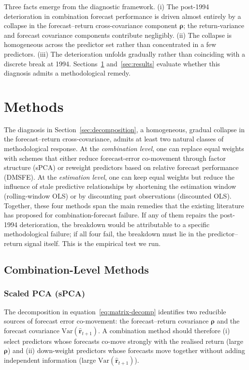 \documentclass[a4paper,11pt]{article}
\begin{document}
Three facts emerge from the diagnostic framework. (i) The post-1994
deterioration in combination forecast performance is driven almost
entirely by a collapse in the forecast--return cross-covariance
component $\boldsymbol{\rho}$; the return-variance and forecast
covariance components contribute negligibly. (ii) The collapse is
homogeneous across the predictor set rather than concentrated in a few
predictors. (iii) The deterioration unfolds gradually rather than
coinciding with a discrete break at 1994. Sections~\ref{sec:methods}
and~\ref{sec:results} evaluate whether this diagnosis admits a
methodological remedy.

\section{Methods}\label{sec:methods}

The diagnosis in Section~\ref{sec:decomposition}, a homogeneous,
gradual collapse in the forecast--return cross-covariance, admits at
least two natural classes of methodological response. At the
\emph{combination level}, one can replace equal weights with schemes that
either reduce forecast-error co-movement through factor structure (sPCA)
or reweight predictors based on relative forecast performance (DMSFE).
At the \emph{estimation level}, one can keep equal weights but reduce the
influence of stale predictive relationships by shortening the estimation
window (rolling-window OLS) or by discounting past observations
(discounted OLS). Together, these four methods span the main remedies
that the existing literature has proposed for combination-forecast
failure. If any of them repairs the post-1994 deterioration, the
breakdown would be attributable to a specific methodological failure; if
all four fail, the breakdown must lie in the predictor--return signal
itself. This is the empirical test we run.

\subsection{Combination-Level Methods}

\subsubsection{Scaled PCA (sPCA)}\label{subsubsec:spca}

The decomposition in equation~\eqref{eq:matrix-decomp} identifies two
reducible sources of forecast error co-movement: the forecast--return
covariance $\boldsymbol{\rho}$ and the forecast covariance
$\mathrm{Var}(\hat{\mathbf{r}}_{t+1})$. A combination method should
therefore (i) select predictors whose forecasts co-move strongly with the
realised return (large $\boldsymbol{\rho}$) and (ii) down-weight
predictors whose forecasts move together without adding independent
information (large $\mathrm{Var}(\hat{\mathbf{r}}_{t+1})$).
\end{document}
